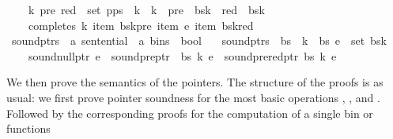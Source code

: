\begin{isabellebody}
\ \ \ \ {\isacharparenleft}{\kern0pt}k{\isacharprime}{\kern0pt}{\isacharcomma}{\kern0pt}\ pre{\isacharcomma}{\kern0pt}\ red{\isacharparenright}{\kern0pt}\ {\isasymin}\ set\ {\isacharparenleft}{\kern0pt}p{\isacharhash}{\kern0pt}ps{\isacharparenright}{\kern0pt}\ {\isasymlongrightarrow}\ k{\isacharprime}{\kern0pt}\ {\isacharless}{\kern0pt}\ k\ {\isasymand}\ pre\ {\isacharless}{\kern0pt}\ {\isacharbar}{\kern0pt}bs{\isacharbang}{\kern0pt}k{\isacharprime}{\kern0pt}{\isacharbar}{\kern0pt}\ {\isasymand}\ red\ {\isacharless}{\kern0pt}\ {\isacharbar}{\kern0pt}bs{\isacharbang}{\kern0pt}k{\isacharbar}{\kern0pt}\ {\isasymand}\isanewline
\ \ \ \ completes\ k\ {\isacharparenleft}{\kern0pt}item\ {\isacharparenleft}{\kern0pt}bs{\isacharbang}{\kern0pt}k{\isacharprime}{\kern0pt}{\isacharbang}{\kern0pt}pre{\isacharparenright}{\kern0pt}{\isacharparenright}{\kern0pt}\ {\isacharparenleft}{\kern0pt}item\ e{\isacharparenright}{\kern0pt}\ {\isacharparenleft}{\kern0pt}item\ {\isacharparenleft}{\kern0pt}bs{\isacharbang}{\kern0pt}k{\isacharbang}{\kern0pt}red{\isacharparenright}{\kern0pt}{\isacharparenright}{\kern0pt}{\isachardoublequoteclose}\isanewline
\isanewline
{}\isamarkupfalse%
\ sound{\isacharunderscore}{\kern0pt}ptrs\ {\isacharcolon}{\kern0pt}{\isacharcolon}{\kern0pt}\ {\isachardoublequoteopen}{\isacharprime}{\kern0pt}a\ sentential\ {\isasymRightarrow}\ {\isacharprime}{\kern0pt}a\ bins\ {\isasymRightarrow}\ bool{\isachardoublequoteclose}\ \isanewline
\ \ {\isachardoublequoteopen}sound{\isacharunderscore}{\kern0pt}ptrs\ {\isasymomega}\ bs\ {\isasymequiv}\ {\isasymforall}k\ {\isacharless}{\kern0pt}\ {\isacharbar}{\kern0pt}bs{\isacharbar}{\kern0pt}{\isachardot}{\kern0pt}\ {\isasymforall}e\ {\isasymin}\ set\ {\isacharparenleft}{\kern0pt}bs{\isacharbang}{\kern0pt}k{\isacharparenright}{\kern0pt}{\isachardot}{\kern0pt}\isanewline
\ \ \ \ sound{\isacharunderscore}{\kern0pt}null{\isacharunderscore}{\kern0pt}ptr\ e\ {\isasymand}\ sound{\isacharunderscore}{\kern0pt}pre{\isacharunderscore}{\kern0pt}ptr\ {\isasymomega}\ bs\ k\ e\ {\isasymand}\ sound{\isacharunderscore}{\kern0pt}prered{\isacharunderscore}{\kern0pt}ptr\ bs\ k\ e{\isachardoublequoteclose}%
\begin{isamarkuptext}%
We then prove the semantics of the pointers. The structure of the proofs is as usual: we first
prove pointer soundness for the most basic operations , , and .
Followed by the corresponding proofs for the computation of a single bin or functions 

\end{isamarkuptext}
\end{isabellebody}
